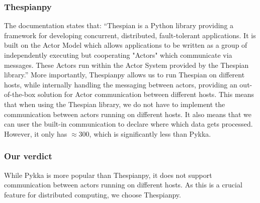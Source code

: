 \documentclass[a4paper]{article}
\begin{document}
\subsubsection{Thespianpy}
The documentation states that: \enquote{Thespian is a Python library providing a framework for developing concurrent, distributed, fault-tolerant applications. It is built on the Actor Model which allows applications to be written as a group of independently executing but cooperating "Actors" which communicate via messages. These Actors run within the Actor System provided by the Thespian library.} More importantly, Thespianpy allows us to run Thespian on different hosts, while internally handling the messaging between actors, providing an out-of-the-box solution for Actor communication between different hosts. This means that when using the Thespian library, we do not have to implement the communication between actors running on different hosts. It also means that we can user the built-in communication to declare where which data gets processed. However, it only has \(\approx300\), which is significantly less than Pykka.
\subsubsection{Our verdict}
While Pykka is more popular than Thespianpy, it does not support communication between actors running on different hosts. As this is a crucial feature for distributed computing, we choose Thespianpy.
\end{document}
